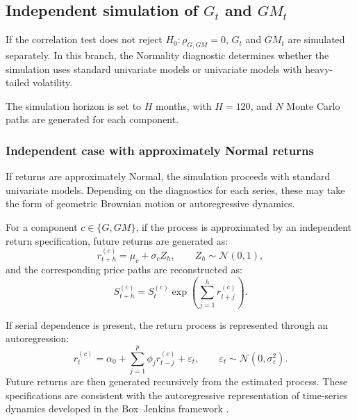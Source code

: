 \documentclass[authoryear,preprint,review,10pt]{elsarticle}
\begin{document}
\subsection{Independent simulation of $G_t$ and $GM_t$}
\label{appendix:independent_simulation}

If the correlation test does not reject $H_0:\rho_{G,GM}=0$, $G_t$ and $GM_t$ are simulated separately. In this branch, the Normality diagnostic determines whether the simulation uses standard univariate models or univariate models with heavy-tailed volatility.

The simulation horizon is set to $H$ months, with $H=120$, and $N$ Monte Carlo paths are generated for each component.

\subsubsection{Independent case with approximately Normal returns}
\label{appendix:independent_normal}

If returns are approximately Normal, the simulation proceeds with standard univariate models. Depending on the diagnostics for each series, these may take the form of geometric Brownian motion or autoregressive dynamics.

For a component $c \in \{G,GM\}$, if the process is approximated by an independent return specification, future returns are generated as:
\begin{equation}
    r_{t+h}^{(c)} = \mu_c + \sigma_c Z_h,
    \qquad Z_h \sim \mathcal{N}(0,1),
\end{equation}
and the corresponding price paths are reconstructed as:
\begin{equation}
    S_{t+h}^{(c)} = S_t^{(c)} \exp\!\left( \sum_{j=1}^h r_{t+j}^{(c)} \right).
\end{equation}

If serial dependence is present, the return process is represented through an autoregression:
\begin{equation}
    r_t^{(c)} = \alpha_0 + \sum_{j=1}^p \phi_j r_{t-j}^{(c)} + \varepsilon_t,
    \qquad \varepsilon_t \sim \mathcal{N}(0,\sigma_\varepsilon^2).
\end{equation}
Future returns are then generated recursively from the estimated process. These specifications are consistent with the autoregressive representation of time-series dynamics developed in the Box--Jenkins framework \citep{box2015time}.
\end{document}
